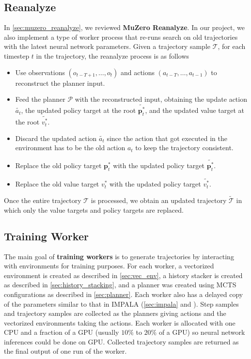 \subsection{Reanalyze} \label{sec:reanalyze}
In \ref{sec:muzero_reanalyze}, we reviewed \textbf{MuZero Reanalyze}.
In our project, we also implement a type of worker process that re-runs search on old trajectories with the latest neural network parameters.
Given a trajectory sample $\mathcal{T}$, for each timestep $t$ in the trajectory, the reanalyze process is as follows
\begin{itemize}
    \item Use observations $(o_{t - T + 1}, \dots, o_{t})$ and actions $(a_{t - T}, \dots, a_{t - 1})$ to reconstruct the planner input.
    \item Feed the planner $\mathcal{P}$ with the reconstructed input, obtaining the update action $\tilde{a_t}$, the updated policy target at the root $\tilde{\mathbf{p}^*_t}$, and the updated value target at the root $\tilde{v^*_t}$.
    \item Discard the updated action $\tilde{a_t}$ since the action that got executed in the environment has to be the old action $a_t$ to keep the trajectory consistent.
    \item Replace the old policy target $\mathbf{p}^*_t$ with the updated policy target $\tilde{\mathbf{p}^*_t}$.
    \item Replace the old value target $v^*_t$ with the updated policy target $\tilde{v^*_t}$.
\end{itemize}
Once the entire trajectory $\mathcal{T}$ is processed, we obtain an updated trajectory $\tilde{\mathcal{T}}$ in which only the value targets and policy targets are replaced.

\subsection{Training Worker} \label{sec:train_rw}
The main goal of \textbf{training workers} is to generate trajectories by interacting with environments for training purposes.
For each worker, a vectorized environment is created as described in \ref{sec:vec_env}, a history stacker is created as described in \ref{sec:history_stacking}, and a planner was created using MCTS configurations as described in \ref{sec:planner}.
Each worker also has a delayed copy of the parameters similar to that in IMPALA (\ref{sec:impala} and \cite{IMPALAScalableDistributed_Espeholt.Soyer.ea_2018}).
Step samples and trajectory samples are collected as the planners giving actions and the vectorized environments taking the actions.
Each worker is allocated with one CPU and a fraction of a GPU (usually $10\% $ to $20\%$ of a GPU) so neural network inferences could be done on GPU.
Collected trajectory samples are returned as the final output of one run of the worker.

